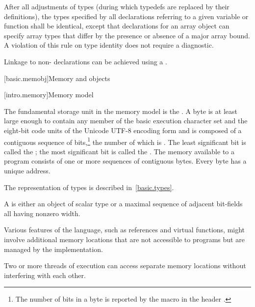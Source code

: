 \pnum
{}%
%
After all adjustments of types (during which
typedefs are replaced by their definitions), the
types specified by all declarations referring to a given variable or
function shall be identical, except that declarations for an array
object can specify array types that differ by the presence or absence of
a major array bound. A violation of this rule on type
identity does not require a diagnostic.

\pnum
\begin{note} Linkage to non-\Cpp{} declarations can be achieved using a
. \end{note}%

[basic.memobj]{Memory and objects}

[intro.memory]{Memory model}

\pnum
{}%
The fundamental storage unit in the \Cpp{} memory model is the
.
A byte is at least large enough to contain any member of the basic
%
execution character set
and the eight-bit code units of the Unicode UTF-8 encoding form
and is composed of a contiguous sequence of
bits,\footnote{The number of bits in a byte is reported by the macro
 in the header .}
the number of which is . The least
significant bit is called the ; the most
significant bit is called the . The memory
available to a \Cpp{} program consists of one or more sequences of
contiguous bytes. Every byte has a unique address.

\pnum
\begin{note} The representation of types is described
in~\ref{basic.types}. \end{note}

\pnum
A  is either an object of scalar type or a maximal
sequence of adjacent bit-fields all having nonzero width. \begin{note} Various
features of the language, such as references and virtual functions, might
involve additional memory locations that are not accessible to programs but are
managed by the implementation. \end{note} Two or more threads of
execution can access separate memory
locations without interfering with each other.

